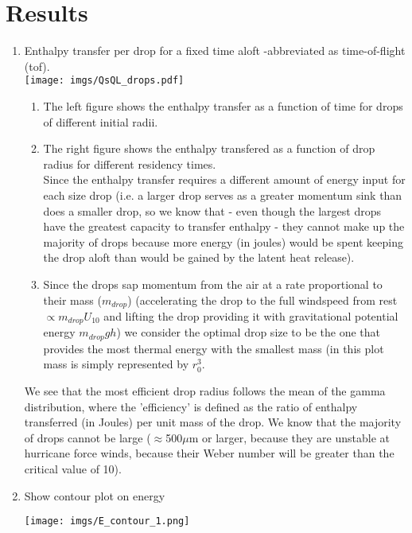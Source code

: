 \documentclass[10pt,a4paper]{article}
\begin{document}
\section{Results}
\begin{enumerate}
\item Enthalpy transfer per drop for a fixed time aloft -abbreviated as time-of-flight (tof).\\
\hspace*{-1.2in}\texttt{[image: imgs/QsQL\_drops.pdf]}
\begin{enumerate}
\item The left figure shows the enthalpy transfer as a function of time for drops of different initial radii.\\
\item The right figure shows the enthalpy transfered as a function of drop radius for different residency times.\\
Since the enthalpy transfer requires a different amount of energy input for each size drop (i.e. a larger drop serves as a greater momentum sink than does a smaller drop, so we know that - even though the largest drops have the greatest capacity to transfer enthalpy - they cannot make up the majority of drops because more energy (in joules) would be spent keeping the drop aloft than would be gained by the latent heat release). 
\item Since the drops sap momentum from the air at a rate proportional to their mass ($m_{drop}$) (accelerating the drop to the full windspeed from rest $\propto m_{drop}U_{10}$  and lifting the drop providing it with gravitational potential energy $m_{drop}gh$) we consider the optimal drop size to be the one that provides the most thermal energy with the smallest mass (in this plot mass is simply represented by $r_0^3$. 
\end{enumerate}

We see that the most efficient drop radius follows the mean of the gamma distribution, where the 'efficiency' is defined as the ratio of enthalpy transferred (in Joules) per unit mass of the drop. We know that the majority of drops cannot be large ($\approx$500$\mu$m or larger, because they are unstable at hurricane force winds, because their Weber number will be greater than the critical value of 10). 
\item Show contour plot on energy\\
\begin{center}
\texttt{[image: imgs/E\_contour\_1.png]}
\end{center}

\end{enumerate}
\end{document}
